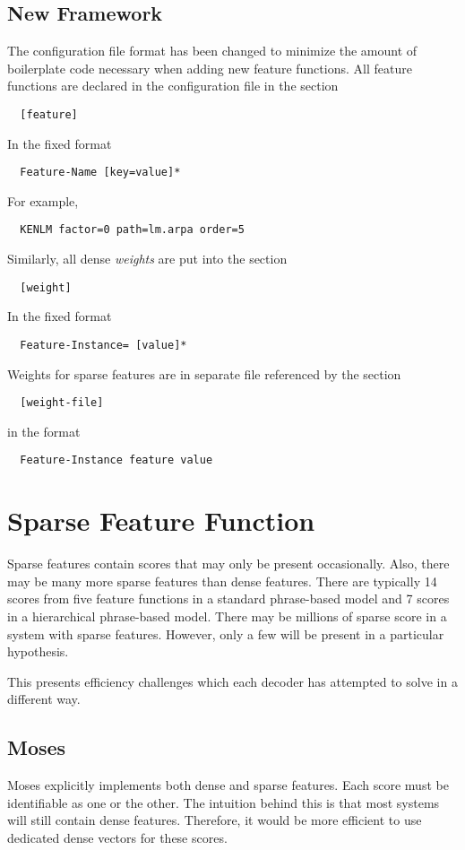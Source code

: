 \documentclass{pbml}
\begin{document}
\subsection{New Framework}
The configuration file format has been changed to minimize the amount of boilerplate code necessary when adding new feature functions. All feature functions are declared in the configuration file in the section
\begin{verbatim}
  [feature]
\end{verbatim}
In the fixed format
\begin{verbatim}
  Feature-Name [key=value]*
\end{verbatim}
For example,
\begin{verbatim}
  KENLM factor=0 path=lm.arpa order=5
\end{verbatim}
Similarly, all dense \emph{weights} are put into the section
\begin{verbatim}
  [weight]
\end{verbatim}
In the fixed format
\begin{verbatim}
  Feature-Instance= [value]*
\end{verbatim}
Weights for sparse features are in separate file referenced by the section
\begin{verbatim}
  [weight-file]
\end{verbatim}
in the format
\begin{verbatim}
  Feature-Instance feature value
\end{verbatim}
  
\section{Sparse Feature Function}

Sparse features contain scores that may only be present occasionally. Also, there may be many more sparse features than dense features. There are typically 14 scores from five feature functions in a standard phrase-based model and 7 scores in a hierarchical phrase-based model. There may be millions of sparse score in a system with sparse features. However, only a few will be present in a particular hypothesis.

This presents efficiency challenges which each decoder has attempted to solve in a different way.

\subsection{Moses}
Moses explicitly implements both dense and sparse features. Each score must be identifiable as one or the other.
The intuition behind this is that most systems will still contain dense features. Therefore, it would be more efficient to use dedicated dense vectors for these scores.
\end{document}
